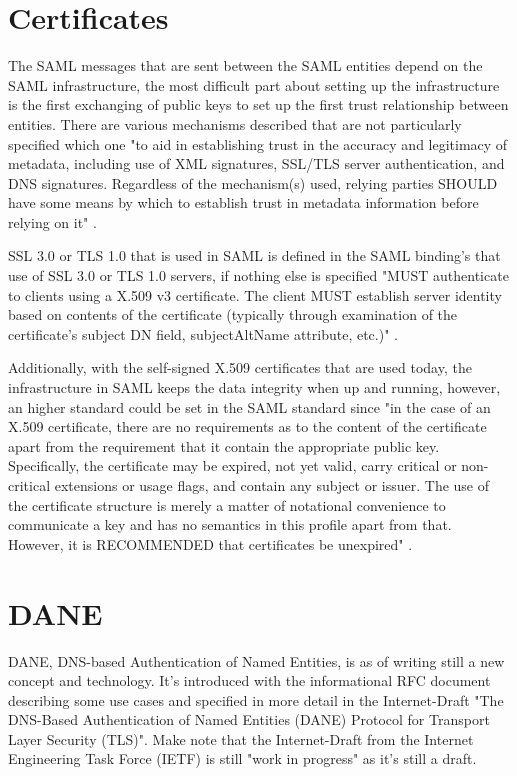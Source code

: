 \section{Certificates} 
The SAML messages that are sent between the SAML entities depend on the SAML infrastructure, the most difficult part 
about setting up the infrastructure is the first exchanging of public keys to set up the first trust relationship between entities. 
There are various mechanisms described that are not particularly specified which one "to aid in establishing trust in the accuracy 
and legitimacy of metadata, including use of XML signatures, SSL/TLS server authentication, and DNS signatures. 
Regardless of the mechanism(s) used, relying parties SHOULD have some means by which to establish trust in metadata information 
before relying on it" \cite[p.~29]{pdf:oasis-open-metadata}. 

SSL 3.0 or TLS 1.0 that is used in SAML is defined in the SAML binding's that use of SSL 3.0 or TLS 1.0 servers, 
if nothing else is specified "MUST authenticate to clients using a X.509 v3 certificate. The client MUST establish 
server identity based on contents of the certificate (typically through examination of the certificate's subject DN field, 
subjectAltName attribute, etc.)" \cite[p.~8]{pdf:oasis-open-bindings}. 

Additionally, with the self-signed X.509 certificates that are used today, the infrastructure in SAML keeps the data integrity 
when up and running, however, an higher standard could be set in the SAML standard since "in the case of an X.509 certificate, 
there are no requirements as to the content of the certificate apart from the requirement that it contain the appropriate public key. 
Specifically, the certificate may be expired, not yet valid, carry critical or non-critical extensions or usage flags, and contain 
any subject or issuer. The use of the certificate structure is merely a matter of notational convenience to communicate a key and 
has no semantics in this profile apart from that. However, it is RECOMMENDED that certificates be unexpired"  
\cite[p.~11]{pdf:oasis-open-metadata-profile}.

\section{DANE} 
DANE, DNS-based Authentication of Named Entities, is as of writing still a new concept and technology.
It's introduced with the informational RFC document\cite{rfc:6394} describing some use cases and specified in more detail in the Internet-Draft "The DNS-Based Authentication of Named Entities (DANE) Protocol for Transport Layer Security (TLS)"\cite{rfc:draft-dane}.
Make note that the Internet-Draft from the Internet Engineering Task Force (IETF) is still "work in progress" as it's still a draft.

